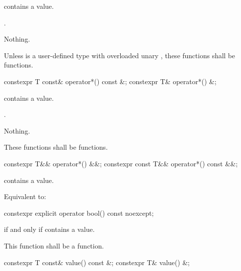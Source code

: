 \begin{itemdescr}
\pnum
\requires
{} contains a value.

\pnum
\returns
{}.

\pnum
\throws
Nothing.

\pnum
\remarks
Unless  is a user-defined type with overloaded unary , these functions shall be  functions.
\end{itemdescr}

%
%
\begin{itemdecl}
constexpr T const& operator*() const &;
constexpr T& operator*() &;
\end{itemdecl}

\begin{itemdescr}
\pnum
\requires
{} contains a value.

\pnum
\returns
{}.

\pnum
\throws
Nothing.

\pnum
\remarks
These functions shall be  functions.
\end{itemdescr}

\begin{itemdecl}
constexpr T&& operator*() &&;
constexpr const T&& operator*() const &&;
\end{itemdecl}

\begin{itemdescr}
\pnum
\requires
{} contains a value.

\pnum
\effects
Equivalent to: 
\end{itemdescr}

%
%
\begin{itemdecl}
constexpr explicit operator bool() const noexcept;
\end{itemdecl}

\begin{itemdescr}
\pnum
\returns
{} if and only if  contains a value.

\pnum
\remarks
This function shall be a  function.
\end{itemdescr}

%
%
\begin{itemdecl}
constexpr T const& value() const &;
constexpr T& value() &;
\end{itemdecl}

